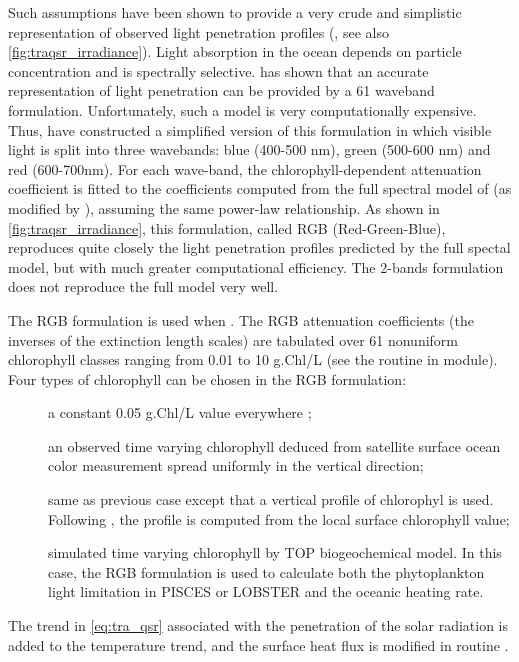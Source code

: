 \documentclass[../main/NEMO_manual]{subfiles}
\begin{document}
Such assumptions have been shown to provide a very crude and simplistic representation of
observed light penetration profiles (\cite{Morel_JGR88}, see also \autoref{fig:traqsr_irradiance}).
Light absorption in the ocean depends on particle concentration and is spectrally selective.
\cite{Morel_JGR88} has shown that an accurate representation of light penetration can be provided by
a 61 waveband formulation.
Unfortunately, such a model is very computationally expensive.
Thus, \cite{Lengaigne_al_CD07} have constructed a simplified version of this formulation in which
visible light is split into three wavebands: blue (400-500 nm), green (500-600 nm) and red (600-700nm).
For each wave-band, the chlorophyll-dependent attenuation coefficient is fitted to the coefficients computed from
the full spectral model of \cite{Morel_JGR88} (as modified by \cite{Morel_Maritorena_JGR01}),
assuming the same power-law relationship.
As shown in \autoref{fig:traqsr_irradiance}, this formulation, called RGB (Red-Green-Blue),
reproduces quite closely the light penetration profiles predicted by the full spectal model,
but with much greater computational efficiency.
The 2-bands formulation does not reproduce the full model very well. 

The RGB formulation is used when .
The RGB attenuation coefficients (\ie the inverses of the extinction length scales) are tabulated over
61 nonuniform chlorophyll classes ranging from 0.01 to 10 g.Chl/L
(see the routine  in  module).
Four types of chlorophyll can be chosen in the RGB formulation:
\begin{description} 
\item[]
  a constant 0.05 g.Chl/L value everywhere ; 
\item[]
  an observed time varying chlorophyll deduced from satellite surface ocean color measurement spread uniformly in
  the vertical direction;
\item[]
  same as previous case except that a vertical profile of chlorophyl is used.
  Following \cite{Morel_Berthon_LO89}, the profile is computed from the local surface chlorophyll value;
\item[]
  simulated time varying chlorophyll by TOP biogeochemical model.
  In this case, the RGB formulation is used to calculate both the phytoplankton light limitation in
  PISCES or LOBSTER and the oceanic heating rate. 
\end{description} 
The trend in \autoref{eq:tra_qsr} associated with the penetration of the solar radiation is added to
the temperature trend, and the surface heat flux is modified in routine .
\end{document}

